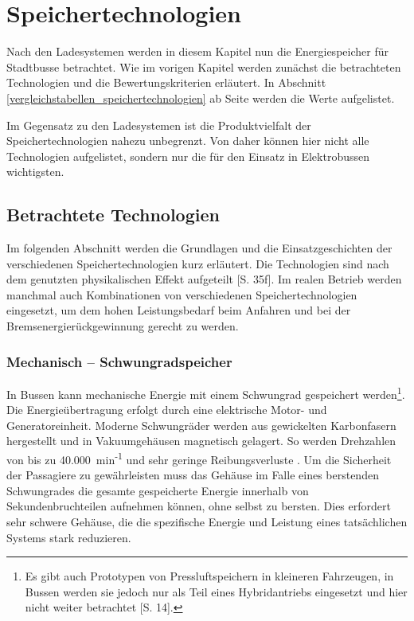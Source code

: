 \chapter{Speichertechnologien}

Nach den Ladesystemen werden in diesem Kapitel nun die Energiespeicher für Stadtbusse betrachtet. Wie im vorigen Kapitel werden zunächst die betrachteten Technologien und die Bewertungskriterien erläutert. In Abschnitt \ref{vergleichstabellen_speichertechnologien} ab Seite \pageref{vergleichstabellen_speichertechnologien} werden die Werte aufgelistet.

Im Gegensatz zu den Ladesystemen ist die Produktvielfalt der Speichertechnologien nahezu unbegrenzt. Von daher können hier nicht alle Technologien aufgelistet, sondern nur die für den Einsatz in Elektrobussen wichtigsten.

\section{Betrachtete Technologien}
Im folgenden Abschnitt werden die Grundlagen und die Einsatzgeschichten der verschiedenen Speichertechnologien kurz erläutert. Die Technologien sind nach dem genutzten physikalischen Effekt aufgeteilt \cite{Sterner:2014}[S. 35f]. Im realen Betrieb werden manchmal auch Kombinationen von verschiedenen Speichertechnologien eingesetzt, um dem hohen Leistungsbedarf beim Anfahren und bei der Bremsenergierückgewinnung gerecht zu werden.

\subsection{Mechanisch – Schwungradspeicher}
In Bussen kann mechanische Energie mit einem Schwungrad gespeichert werden\footnote{Es gibt auch Prototypen von Pressluftspeichern in kleineren Fahrzeugen, in Bussen werden sie jedoch nur als Teil eines Hybridantriebs eingesetzt und hier nicht weiter betrachtet \cite{Sebastian-Naumann:2014}[S. 14].}. Die Energieübertragung erfolgt durch eine elektrische Motor- und Generatoreinheit. Moderne Schwungräder werden aus gewickelten Karbonfasern hergestellt und in Vakuumgehäusen magnetisch gelagert. So werden Drehzahlen von bis zu 40.000~min\textsuperscript{-1} und sehr geringe Reibungsverluste \cite{993788}. Um die Sicherheit der Passagiere zu gewährleisten muss das Gehäuse im Falle eines berstenden Schwungrades die gesamte gespeicherte Energie innerhalb von Sekundenbruchteilen aufnehmen können, ohne selbst zu bersten. Dies erfordert sehr schwere Gehäuse, die die spezifische Energie und Leistung eines tatsächlichen Systems stark reduzieren.

